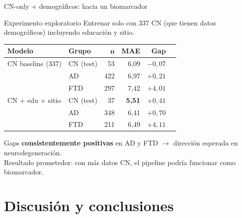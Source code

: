 \documentclass[aspectratio=169, 11pt]{beamer}
\newcommand{\highlight}[1]{\textcolor{uncaccent}{\textbf{#1}}}
\begin{document}
\begin{frame}{CN-only + demográficos: hacia un biomarcador}
  \begin{block}{Experimento exploratorio}
    {\small Entrenar solo con 337 CN (que tienen datos demográficos) incluyendo educación y sitio.}
  \end{block}

  \vspace{0.2cm}
  \centering
  {\small
  \begin{tabular}{llrrrr}
    \toprule
    \textbf{Modelo} & \textbf{Grupo} & $\boldsymbol{n}$ & \textbf{MAE} & \textbf{Gap} \\
    \midrule
    CN baseline (337) & CN (test) & 53 & 6,09 & $-0{,}07$ \\
                & AD       & 422 & 6,97 & $+0{,}21$ \\
                & FTD      & 297 & 7,42 & $+4{,}01$ \\
    \midrule
    CN + edu + sitio & CN (test) & 37 & \highlight{5,51} & $+0{,}41$ \\
                     & AD       & 348 & 6,41 & $+0{,}70$ \\
                     & FTD      & 211 & 6,49 & \highlight{$+4{,}11$} \\
    \bottomrule
  \end{tabular}}

  \vspace{0.25cm}
  {\small Gaps \highlight{consistentemente positivas} en AD y FTD $\rightarrow$ dirección esperada en neurodegeneración.\\
  Resultado prometedor: con más datos CN, el pipeline podría funcionar como biomarcador.}
\end{frame}


\section{Discusión y conclusiones}
\end{document}
